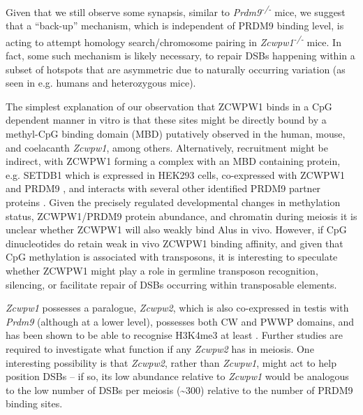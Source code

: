 Given that we still observe some synapsis, similar to \textit{Prdm9\textsuperscript{-/-}} mice, we suggest that a ``back-up'' mechanism, which is independent of PRDM9 binding level, is acting to attempt homology search/chromosome pairing in \textit{Zcwpw1\textsuperscript{-/-}} mice. In fact, some such mechanism is likely necessary, to repair DSBs happening within a subset of hotspots that are asymmetric due to naturally occurring variation (as seen in e.g. humans and heterozygous mice).

\iffalse
If our observed >9-fold changes in relative DMC1 levels for strongly vs. weakly bound hotspots purely reflect increased DMC1 persistence, it might be this mechanism is greatly slower than the PRDM9-dependent pathway for wild-type mice. In turn, this could explain many – or all – of the downstream phenotypes in these mice, as consequences of delayed homology search.
\fi


The simplest explanation of our observation that ZCWPW1 binds in a CpG dependent manner in vitro is that these sites might be directly bound by a methyl-CpG binding domain (MBD) putatively observed in the human, mouse, and coelacanth \textit{Zcwpw1}, among others. Alternatively, recruitment might be indirect, with ZCWPW1 forming a complex with an MBD containing protein, e.g. SETDB1 which is expressed in HEK293 cells, co-expressed with ZCWPW1 and PRDM9 \parencite{Jung2019Unified, Schultz2002SETDB1}, and interacts with several other identified PRDM9 partner proteins \parencite{Mulligan2008CDYL, Parvanov2017PRDM9}. Given the precisely regulated developmental changes in methylation status, ZCWPW1/PRDM9 protein abundance, and chromatin during meiosis \parencite{Gaysinskaya2018Transient, SeisenbergerStefanie2013Reprogramming} it is unclear whether ZCWPW1 will also weakly bind Alus in vivo. However, if CpG dinucleotides do retain weak in vivo ZCWPW1 binding affinity, and given that CpG methylation is associated with transposons, it is interesting to speculate whether ZCWPW1 might play a role in germline transposon recognition, silencing, or facilitate repair of DSBs occurring within transposable elements.

\textit{Zcwpw1} possesses a paralogue, \textit{Zcwpw2}, which is also co-expressed in testis with \textit{Prdm9} (although at a lower level), possesses both CW and PWWP domains, and has been shown to be able to recognise H3K4me3 at least \parencite{Liu2016Familywide}. Further studies are required to investigate what function if any \textit{Zcwpw2} has in meiosis. One interesting possibility is that \textit{Zcwpw2}, rather than \textit{Zcwpw1}, might act to help position DSBs – if so, its low abundance relative to \textit{Zcwpw1} would be analogous to the low number of DSBs per meiosis (\textasciitilde300) relative to the number of PRDM9 binding sites.

